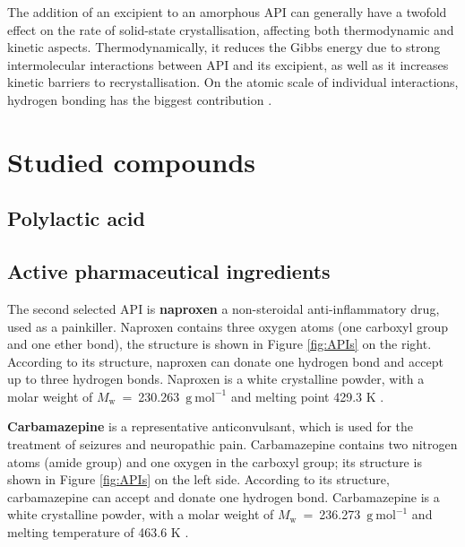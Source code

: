 The addition of an excipient to an amorphous API can generally have a twofold effect on the rate of solid-state crystallisation, affecting both thermodynamic and kinetic aspects. Thermodynamically, it reduces the Gibbs energy due to strong intermolecular interactions between API and its excipient, as well as it increases kinetic barriers to recrystallisation. On the atomic scale of individual interactions, hydrogen bonding has the biggest contribution \cite{newman_what_2022}.

\section{Studied compounds}
    \subsection{Polylactic acid}

    \subsection{Active pharmaceutical ingredients}


    The second selected API is \textbf{naproxen} a non-steroidal anti-inflammatory drug, used as a painkiller. Naproxen contains three oxygen atoms (one carboxyl group and one ether bond), the structure is shown in Figure \ref{fig:APIs} on the right. According to its structure, naproxen can donate one hydrogen bond and accept up to three hydrogen bonds. Naproxen is a white crystalline powder, with a molar weight of $M_\mathrm{w}$~=~230.263~$\mathrm{g\ mol^{-1}}$ and melting point 429.3 K \cite{stejfa_heat_2021}.

    \textbf{Carbamazepine} is a representative anticonvulsant, which is used for the treatment of seizures and neuropathic pain. Carbamazepine contains two nitrogen atoms (amide group) and one oxygen in the carboxyl group; its structure is shown in Figure \ref{fig:APIs} on the left side. According to its structure, carbamazepine can accept and donate one hydrogen bond. Carbamazepine is a white crystalline powder, with a molar weight of $M_\mathrm{w}$~=~236.273~$\mathrm{g\ mol^{-1}}$ and melting temperature of 463.6 K \cite{stejfa_heat_2021}.

